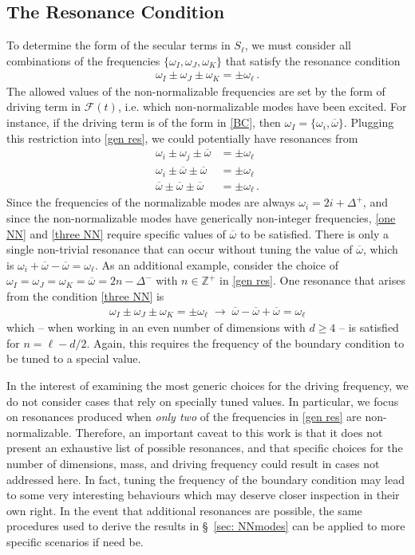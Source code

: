 \documentclass[letterpaper,11pt]{article}
\newcommand{\oi}{\omega_i}
\newcommand{\ol}{\omega_\ell}
\newcommand{\mc}{\mathcal}
\newcommand{\ob}{\overline{\omega}}
\begin{document}
\subsection{The Resonance Condition}

To determine the form of the secular terms in $S_\ell$, we must consider all combinations of the frequencies ${\{ \omega_I, \omega_J, \omega_K\}}$ that satisfy the resonance condition
\begin{align}
\label{gen res}
\omega_I \pm \omega_J \pm \omega_K = \pm \ol \, .
\end{align}
The allowed values of the non-normalizable frequencies are set by the form of driving term in $\mc F(t)$, i.e. which non-normalizable modes have been excited. For instance, if the driving term is of the form in \eqref{BC}, then $\omega_I = \{\omega_i, \ob\}$. Plugging this restriction into \eqref{gen res}, we could potentially have resonances from
\begin{align}
	\label{one NN}
	\omega_i \pm \omega_j \pm \ob &= \pm \ol \\
	\label{two NN}
	\omega_i \pm \ob \pm \ob &= \pm \ol \\
	\label{three NN}
	\ob \pm \ob \pm \ob &= \pm \ol \, .
\end{align}
Since the frequencies of the normalizable modes are always $\oi = 2i + \Delta^+$, and since the non-normalizable modes have generically non-integer frequencies, \eqref{one NN} and \eqref{three NN} require specific values of $\ob$ to be satisfied. There is only a single non-trivial resonance that can occur without tuning the value of $\ob$, which is $\oi + \ob - \ob = \ol$. As an additional example, consider the choice of ${ \omega_I = \omega_J = \omega_K =\ob = 2n - \Delta^-}$ with $n \in \mathbb{Z}^+$ in \eqref{gen res}. One resonance that arises from the condition \eqref{three NN} is
\begin{align}
\omega_I \pm \omega_J \pm \omega_K = \pm \ol \; \to \; \ob - \ob + \ob = \ol
\end{align}
which -- when working in an even number of dimensions with $d \geq 4$ -- is satisfied for $n = \ell - d/2$. Again, this requires the frequency of the boundary condition to be tuned to a special value. 

In the interest of examining the most generic choices for the driving frequency, we do not consider cases that rely on specially tuned values. In particular, we focus on resonances produced when \emph{only two} of the frequencies in \eqref{gen res} are non-normalizable. Therefore, an important caveat to this work is that it does not present an exhaustive list of possible resonances, and that specific choices for the number of dimensions, mass, and driving frequency could result in cases not addressed here. In fact, tuning the frequency of the boundary condition may lead to some very interesting behaviours which may deserve closer inspection in their own right. In the event that additional resonances are possible, the same procedures used to derive the results in \S\!~\ref{sec: NNmodes} can be applied to more specific scenarios if need be.
\end{document}
